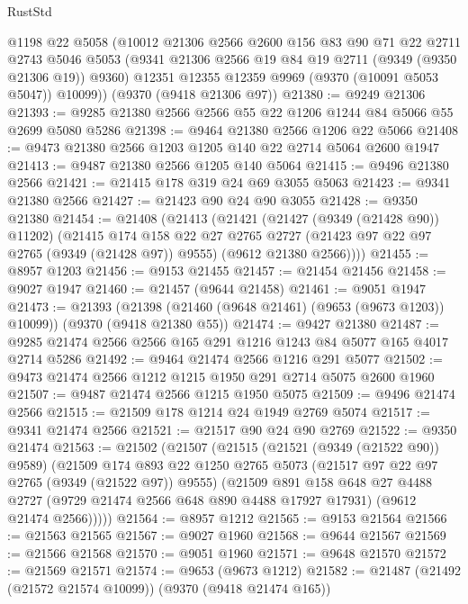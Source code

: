 \begin{lexlean}{RustStd}
\begin{coremodule}
{\begin{coremodule}
{{{{{{{{{{{{{{{{{{{{{{{{{{{{{{{{{{{{{{{      @1198
      @22
      @5058
      (@10012
        @21306
        @2566
        @2600
        @156
        @83
        @90
        @71
        @22
        @2711
        @2743
        @5046
        @5053
        (@9341 @21306 @2566 @19 @84 @19 @2711 (@9349 (@9350 @21306 @19)) @9360)
        @12351
        @12355
        @12359
        @9969
        (@9370 (@10091 @5053 @5047))
        @10099))
    (@9370 (@9418 @21306 @97))
@21380 := @9249 @21306
@21393 := @9285 @21380 @2566 @2566 @55 @22 @1206 @1244 @84 @5066 @55 @2699 @5080 @5286
@21398 := @9464 @21380 @2566 @1206 @22 @5066
@21408 := @9473 @21380 @2566 @1203 @1205 @140 @22 @2714 @5064 @2600 @1947
@21413 := @9487 @21380 @2566 @1205 @140 @5064
@21415 := @9496 @21380 @2566
@21421 := @21415 @178 @319 @24 @69 @3055 @5063
@21423 := @9341 @21380 @2566
@21427 := @21423 @90 @24 @90 @3055
@21428 := @9350 @21380
@21454 := @21408
    (@21413
      (@21421
        (@21427 (@9349 (@21428 @90)) @11202)
        (@21415
          @174
          @158
          @22
          @27
          @2765
          @2727
          (@21423 @97 @22 @97 @2765 (@9349 (@21428 @97)) @9555)
          (@9612 @21380 @2566))))
@21455 := @8957 @1203
@21456 := @9153 @21455
@21457 := @21454 @21456
@21458 := @9027 @1947
@21460 := @21457 (@9644 @21458)
@21461 := @9051 @1947
@21473 := @21393
    (@21398 (@21460 (@9648 @21461) (@9653 (@9673 @1203)) @10099))
    (@9370 (@9418 @21380 @55))
@21474 := @9427 @21380
@21487 := @9285 @21474 @2566 @2566 @165 @291 @1216 @1243 @84 @5077 @165 @4017 @2714 @5286
@21492 := @9464 @21474 @2566 @1216 @291 @5077
@21502 := @9473 @21474 @2566 @1212 @1215 @1950 @291 @2714 @5075 @2600 @1960
@21507 := @9487 @21474 @2566 @1215 @1950 @5075
@21509 := @9496 @21474 @2566
@21515 := @21509 @178 @1214 @24 @1949 @2769 @5074
@21517 := @9341 @21474 @2566
@21521 := @21517 @90 @24 @90 @2769
@21522 := @9350 @21474
@21563 := @21502
    (@21507
      (@21515
        (@21521 (@9349 (@21522 @90)) @9589)
        (@21509
          @174
          @893
          @22
          @1250
          @2765
          @5073
          (@21517 @97 @22 @97 @2765 (@9349 (@21522 @97)) @9555)
          (@21509
            @891
            @158
            @648
            @27
            @4488
            @2727
            (@9729 @21474 @2566 @648 @890 @4488 @17927 @17931)
            (@9612 @21474 @2566)))))
@21564 := @8957 @1212
@21565 := @9153 @21564
@21566 := @21563 @21565
@21567 := @9027 @1960
@21568 := @9644 @21567
@21569 := @21566 @21568
@21570 := @9051 @1960
@21571 := @9648 @21570
@21572 := @21569 @21571
@21574 := @9653 (@9673 @1212)
@21582 := @21487 (@21492 (@21572 @21574 @10099)) (@9370 (@9418 @21474 @165))
}}}}}}}}}}}}}}}}}}}}}}}}}}}}}}}}}}}}}}}
\end{coremodule}}
\end{coremodule}
\end{lexlean}
